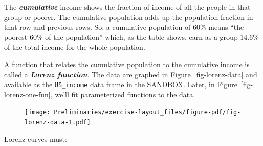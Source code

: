 \documentclass[
  letterpaper,
  DIV=11,
  numbers=noendperiod,
  oneside]{article}
\begin{document}
\begin{multicols}{2}
\begin{table}
\begin{minipage}[t]{\linewidth}
{}

\end{minipage}%
\newline
\begin{minipage}[t]{\linewidth}

{\centering 

The \textbf{\emph{cumulative}} income shows the fraction of income of
all the people in that group or poorer. The cumulative population adds
up the population fraction in that row and previous rows. So, a
cumulative population of 60\% means ``the poorest 60\% of the
population'' which, as the table shows, earn as a group 14.6\% of the
total income for the whole population.

}

\end{minipage}%
\newline
\begin{minipage}[t]{\linewidth}

{\centering 

A function that relates the cumulative population to the cumulative
income is called a \textbf{\emph{Lorenz function}}. The data are graphed
in Figure~\ref{fig-lorenz-data} and available as the \texttt{US\_income}
data frame in the SANDBOX. Later, in Figure~\ref{fig-lorenz-one-fun},
we'll fit parameterized functions to the data.

}

\end{minipage}%
\newline
\begin{minipage}[t]{\linewidth}

{\centering 

\begin{figure}


{\centering \texttt{[image: Preliminaries/exercise-layout\_files/figure-pdf/fig-lorenz-data-1.pdf]}

}

\end{figure}

}

\end{minipage}%
\newline
\begin{minipage}[t]{\linewidth}

{\centering 

Lorenz curves must:

}
\end{minipage}
\end{table}
\end{multicols}
\end{document}
